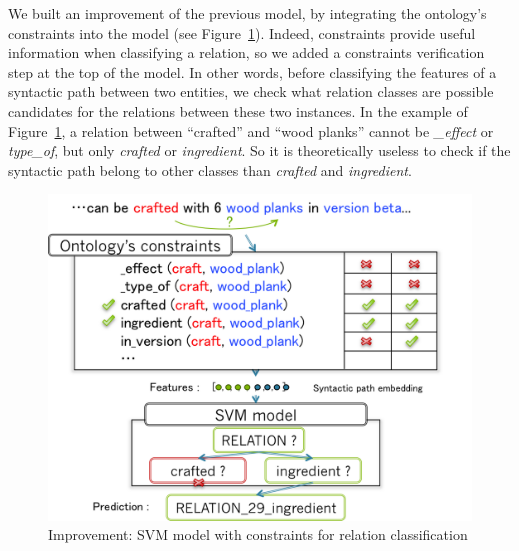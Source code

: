 \documentclass[12pt]{article}
\begin{document}
We built an improvement of the previous model, by integrating the ontology's constraints into the model (see Figure~\ref{relationClassificationImprovement}).
Indeed, constraints provide useful information when classifying a relation, so we added a constraints verification step at the top of the model.
In other words, before classifying the features of a syntactic path between two entities, we check what relation classes are possible candidates for the relations between these two instances. In the example of Figure~\ref{relationClassificationImprovement}, a relation between ``crafted'' and ``wood planks'' cannot be \textit{\_effect} or \textit{type\_of}, but only \textit{crafted} or \textit{ingredient}. So it is theoretically useless to check if the syntactic path belong to other classes than \textit{crafted} and \textit{ingredient}.

\begin{figure}[!ht]
   \centering \includegraphics[width=0.7\linewidth]{Figures/Semantic_Parsing/relationClassificationImprovement.png}
   \caption{\label{relationClassificationImprovement} Improvement: SVM model with constraints for relation classification}
\end{figure}
\end{document}
